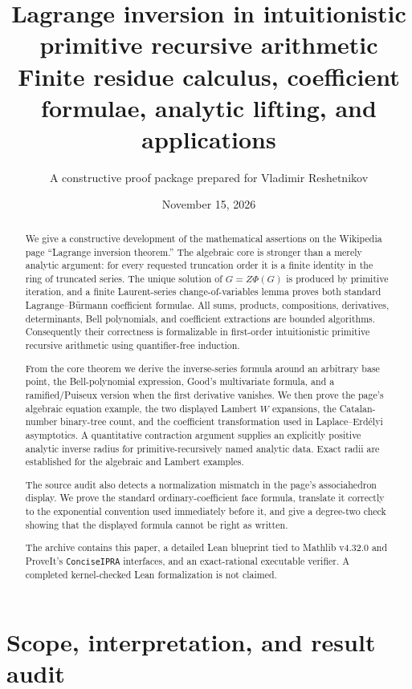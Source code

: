 \documentclass[11pt]{article}
\title{Lagrange inversion in intuitionistic primitive recursive arithmetic\\
Finite residue calculus, coefficient formulae, analytic lifting, and applications}
\author{A constructive proof package prepared for Vladimir Reshetnikov}
\date{November 15, 2026}
\theoremstyle{definition}
\newcommand{\code}[1]{\texttt{#1}}
\begin{document}
\maketitle

\begin{abstract}
We give a constructive development of the mathematical assertions on the
Wikipedia page ``Lagrange inversion theorem.''  The algebraic core is stronger
than a merely analytic argument: for every requested truncation order it is a
finite identity in the ring of truncated series.  The unique solution of
\(G=Z\Phi(G)\) is produced by primitive iteration, and a finite Laurent-series
change-of-variables lemma proves both standard Lagrange--B\"urmann coefficient
formulae.  All sums, products, compositions, derivatives, determinants, Bell
polynomials, and coefficient extractions are bounded algorithms.  Consequently
their correctness is formalizable in first-order intuitionistic primitive
recursive arithmetic using quantifier-free induction.

From the core theorem we derive the inverse-series formula around an arbitrary
base point, the Bell-polynomial expression, Good's multivariate formula, and a
ramified/Puiseux version when the first derivative vanishes.  We then prove the
page's algebraic equation example, the two displayed Lambert \(W\) expansions,
the Catalan-number binary-tree count, and the coefficient transformation used
in Laplace--Erd\'elyi asymptotics.  A quantitative contraction argument supplies
an explicitly positive analytic inverse radius for primitive-recursively named
analytic data.  Exact radii are established for the algebraic and Lambert
examples.

The source audit also detects a normalization mismatch in the page's
associahedron display.  We prove the standard ordinary-coefficient face formula,
translate it correctly to the exponential convention used immediately before
it, and give a degree-two check showing that the displayed formula cannot be
right as written.

The archive contains this paper, a detailed Lean blueprint tied to Mathlib
v4.32.0 and ProveIt's \code{ConciseIPRA} interfaces, and an exact-rational
executable verifier.  A completed kernel-checked Lean formalization is not
claimed.
\end{abstract}

\newpage
\begingroup\small\tableofcontents\endgroup
\newpage

\section{Scope, interpretation, and result audit}\label{sec:scope}
\end{document}
